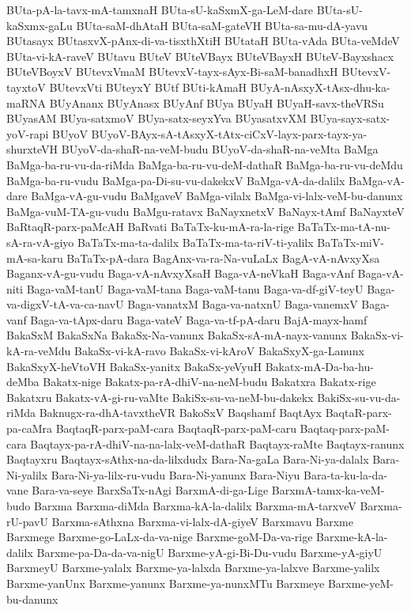 {BUta-pA-la-tavx-mA-tamxnaH
BUta-sU-kaSxmX-ga-LeM-dare
BUta-sU-kaSxmx-gaLu
BUta-saM-dhAtaH
BUta-saM-gateVH
BUta-sa-mu-dA-yavu
BUtasayx
BUtasxvX-pAnx-di-va-tisxthXtiH
BUtataH
BUta-vAda
BUta-veMdeV
BUta-vi-kA-raveV
BUtavu
BUteV
BUteVBayx
BUteVBayxH
BUteV-Bayxshacx
BUteVBoyxV
BUtevxVmaM
BUtevxV-tayx-sAyx-Bi-saM-banadhxH
BUtevxV-tayxtoV
BUtevxVti
BUteyxY
BUtf
BUti-kAmaH
BUyA-nAsxyX-tAsx-dhu-ka-maRNA
BUyAnanx
BUyAnasx
BUyAnf
BUya
BUyaH
BUyaH-savx-theVRSu
BUyasAM
BUya-satxmoV
BUya-satx-seyxYva
BUyasatxvXM
BUya-sayx-satx-yoV-rapi
BUyoV
BUyoV-BAyx-sA-tAsxyX-tAtx-ciCxV-layx-parx-tayx-ya-shurxteVH
BUyoV-da-shaR-na-veM-budu
BUyoV-da-shaR-na-veMta
BaMga
BaMga-ba-ru-vu-da-riMda
BaMga-ba-ru-vu-deM-dathaR
BaMga-ba-ru-vu-deMdu
BaMga-ba-ru-vudu
BaMga-pa-Di-su-vu-dakekxV
BaMga-vA-da-dalilx
BaMga-vA-dare
BaMga-vA-gu-vudu
BaMgaveV
BaMga-vilalx
BaMga-vi-lalx-veM-bu-danunx
BaMga-vuM-TA-gu-vudu
BaMgu-ratavx
BaNayxnetxV
BaNayx-tAmf
BaNayxteV
BaRtaqR-parx-paMcAH
BaRvati
BaTaTx-ku-mA-ra-la-rige
BaTaTx-ma-tA-nu-sA-ra-vA-giyo
BaTaTx-ma-ta-dalilx
BaTaTx-ma-ta-riV-ti-yalilx
BaTaTx-miV-mA-sa-karu
BaTaTx-pA-dara
BagAnx-va-ra-Na-vuLaLx
BagA-vA-nAvxyXsa
Baganx-vA-gu-vudu
Baga-vA-nAvxyXsaH
Baga-vA-neVkaH
Baga-vAnf
Baga-vA-niti
Baga-vaM-tanU
Baga-vaM-tana
Baga-vaM-tanu
Baga-va-df-giV-teyU
Baga-va-digxV-tA-va-ca-navU
Baga-vanatxM
Baga-va-natxnU
Baga-vanemxV
Baga-vanf
Baga-va-tApx-daru
Baga-vateV
Baga-va-tf-pA-daru
BajA-mayx-hamf
BakaSxM
BakaSxNa
BakaSx-Na-vanunx
BakaSx-sA-mA-nayx-vanunx
BakaSx-vi-kA-ra-veMdu
BakaSx-vi-kA-ravo
BakaSx-vi-kAroV
BakaSxyX-ga-Lanunx
BakaSxyX-heVtoVH
BakaSx-yanitx
BakaSx-yeVyuH
Bakatx-mA-Da-ba-hu-deMba
Bakatx-nige
Bakatx-pa-rA-dhiV-na-neM-budu
Bakatxra
Bakatx-rige
Bakatxru
Bakatx-vA-gi-ru-vaMte
BakiSx-su-va-neM-bu-dakekx
BakiSx-su-vu-da-riMda
Baknugx-ra-dhA-tavxtheVR
BakoSxV
Baqshamf
BaqtAyx
BaqtaR-parx-pa-caMra
BaqtaqR-parx-paM-cara
BaqtaqR-parx-paM-caru
Baqtaq-parx-paM-cara
Baqtayx-pa-rA-dhiV-na-na-lalx-veM-dathaR
Baqtayx-raMte
Baqtayx-ranunx
Baqtayxru
Baqtayx-sAthx-na-da-lilxdudx
Bara-Na-gaLa
Bara-Ni-ya-dalalx
Bara-Ni-yalilx
Bara-Ni-ya-lilx-ru-vudu
Bara-Ni-yanunx
Bara-Niyu
Bara-ta-ku-la-da-vane
Bara-va-seye
BarxSaTx-nAgi
BarxmA-di-ga-Lige
BarxmA-tamx-ka-veM-budo
Barxma
Barxma-diMda
Barxma-kA-la-dalilx
Barxma-mA-tarxveV
Barxma-rU-pavU
Barxma-sAthxna
Barxma-vi-lalx-dA-giyeV
Barxmavu
Barxme
Barxmege
Barxme-go-LaLx-da-va-nige
Barxme-goM-Da-va-rige
Barxme-kA-la-dalilx
Barxme-pa-Da-da-va-nigU
Barxme-yA-gi-Bi-Du-vudu
Barxme-yA-giyU
BarxmeyU
Barxme-yalalx
Barxme-ya-lalxda
Barxme-ya-lalxve
Barxme-yalilx
Barxme-yanUnx
Barxme-yanunx
Barxme-ya-nunxMTu
Barxmeye
Barxme-yeM-bu-danunx
}
